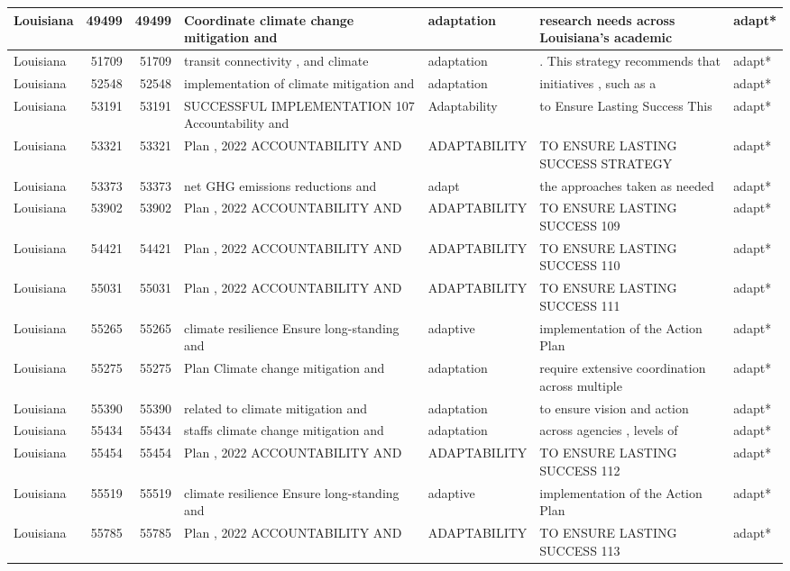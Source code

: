 \documentclass[
]{article}
\begin{document}
\begin{table}
\begin{tabular}[t]{l|r|r|l|l|l|l}
\hline
Louisiana & 49499 & 49499 & Coordinate climate change mitigation and & adaptation & research needs across Louisiana’s academic & adapt*\\
\hline
Louisiana & 51709 & 51709 & transit connectivity , and climate & adaptation & . This strategy recommends that & adapt*\\
\hline
Louisiana & 52548 & 52548 & implementation of climate mitigation and & adaptation & initiatives , such as a & adapt*\\
\hline
Louisiana & 53191 & 53191 & SUCCESSFUL IMPLEMENTATION 107 Accountability and & Adaptability & to Ensure Lasting Success This & adapt*\\
\hline
Louisiana & 53321 & 53321 & Plan , 2022 ACCOUNTABILITY AND & ADAPTABILITY & TO ENSURE LASTING SUCCESS STRATEGY & adapt*\\
\hline
Louisiana & 53373 & 53373 & net GHG emissions reductions and & adapt & the approaches taken as needed & adapt*\\
\hline
Louisiana & 53902 & 53902 & Plan , 2022 ACCOUNTABILITY AND & ADAPTABILITY & TO ENSURE LASTING SUCCESS 109 & adapt*\\
\hline
Louisiana & 54421 & 54421 & Plan , 2022 ACCOUNTABILITY AND & ADAPTABILITY & TO ENSURE LASTING SUCCESS 110 & adapt*\\
\hline
Louisiana & 55031 & 55031 & Plan , 2022 ACCOUNTABILITY AND & ADAPTABILITY & TO ENSURE LASTING SUCCESS 111 & adapt*\\
\hline
Louisiana & 55265 & 55265 & climate resilience Ensure long-standing and & adaptive & implementation of the Action Plan & adapt*\\
\hline
Louisiana & 55275 & 55275 & Plan Climate change mitigation and & adaptation & require extensive coordination across multiple & adapt*\\
\hline
Louisiana & 55390 & 55390 & related to climate mitigation and & adaptation & to ensure vision and action & adapt*\\
\hline
Louisiana & 55434 & 55434 & staffs climate change mitigation and & adaptation & across agencies , levels of & adapt*\\
\hline
Louisiana & 55454 & 55454 & Plan , 2022 ACCOUNTABILITY AND & ADAPTABILITY & TO ENSURE LASTING SUCCESS 112 & adapt*\\
\hline
Louisiana & 55519 & 55519 & climate resilience Ensure long-standing and & adaptive & implementation of the Action Plan & adapt*\\
\hline
Louisiana & 55785 & 55785 & Plan , 2022 ACCOUNTABILITY AND & ADAPTABILITY & TO ENSURE LASTING SUCCESS 113 & adapt*\\

\end{tabular}
\end{table}
\end{document}
